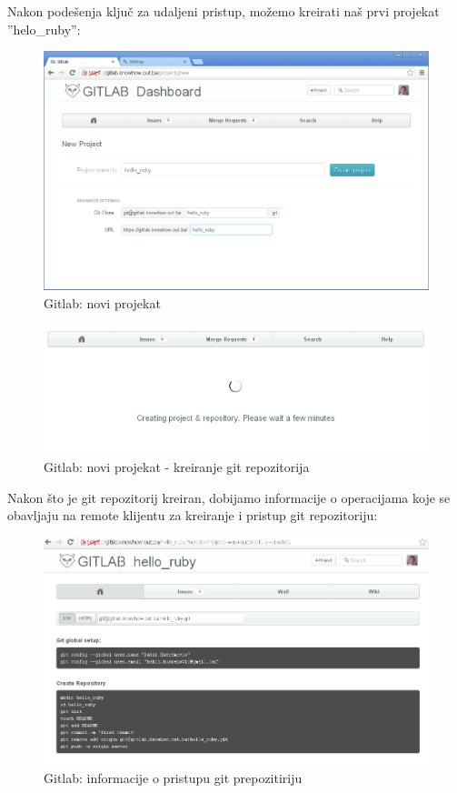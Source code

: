 \documentclass[times, utf8, seminar]{fit}
\begin{document}
Nakon podešenja ključ za udaljeni pristup, možemo kreirati naš prvi projekat ''helo\_ruby'':

\begin{figure}[H]
\centering
\includegraphics[width=15cm]{img/gitlab_new_project.png}
\caption{Gitlab: novi projekat}
\end{figure}

\begin{figure}[H]
\centering
\includegraphics[width=15cm]{img/gitlab_new_project_2.png}
\caption{Gitlab: novi projekat - kreiranje git repozitorija}
\end{figure}

Nakon što je git repozitorij kreiran, dobijamo informacije o operacijama koje se obavljaju na remote klijentu za kreiranje i pristup git repozitoriju:

\begin{figure}[H]
\centering
\includegraphics[width=15cm]{img/gitlab_new_project_3.png}
\caption{Gitlab: informacije o pristupu git prepozitiriju}
\end{figure}
\end{document}
